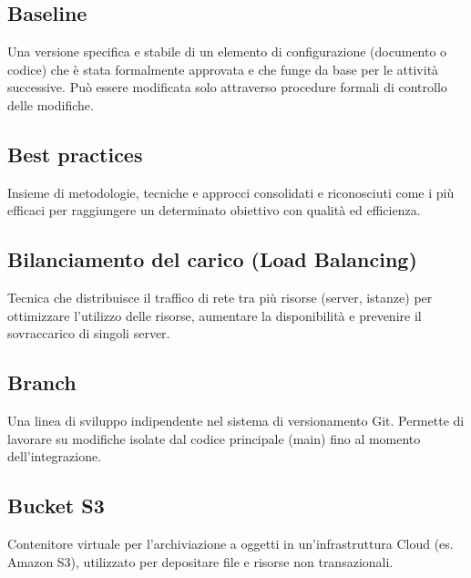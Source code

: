 \documentclass[a4paper, 11pt, oneside]{scrartcl} %
\begin{document}
\subsection*{Baseline}
Una versione specifica e stabile di un elemento di configurazione (documento o codice) che è stata formalmente approvata e che funge da base per le attività successive. Può essere modificata solo attraverso procedure formali di controllo delle modifiche.
\vspace{0.5cm}

\subsection*{Best practices}


Insieme di metodologie, tecniche e approcci consolidati e riconosciuti come i più efficaci per raggiungere un determinato obiettivo con qualità ed efficienza.

\vspace{0.5cm}

\subsection*{Bilanciamento del carico (Load Balancing)}


Tecnica che distribuisce il traffico di rete tra più risorse (server, istanze) per ottimizzare l'utilizzo delle risorse, aumentare la disponibilità e prevenire il sovraccarico di singoli server.

\vspace{0.5cm}

\subsection*{Branch}


Una linea di sviluppo indipendente nel sistema di versionamento Git. Permette di lavorare su modifiche isolate dal codice principale (main) fino al momento dell'integrazione.

\vspace{0.5cm}

\subsection*{Bucket S3}
Contenitore virtuale per l'archiviazione a oggetti in un'infrastruttura Cloud (es. Amazon S3), utilizzato per depositare file e risorse non transazionali.
\vspace{0.5cm}
\end{document}
